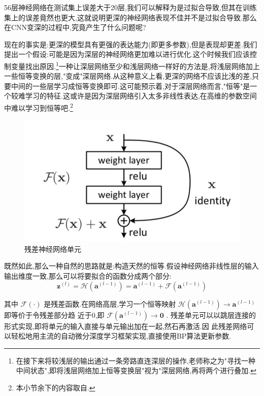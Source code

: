 56层神经网络在测试集上误差大于20层,我们可以解释为是过拟合导致,但其在训练集上的误差竟然也更大,这就说明更深的神经网络表现不佳并不是过拟合导致.那么在CNN变深的过程中,究竟产生了什么问题呢?

现在的事实是:更深的模型具有更强的表达能力(即更多参数),但是表现却更差.我们提出一个假设:可能是因为深层的神经网络更加难以进行优化.这个时候我们应该控制变量找出原因.\footnote{在接下来将较浅层的输出通过一条旁路直连深层的操作,老师称之为"寻找一种中间状态",即将浅层网络加上恒等变换层"视为"深层网络,再将两个进行叠加.}一种让深层网络至少和浅层网络一样好的方法是,将浅层网络加上一些恒等变换的层,"变成"深层网络.从这种意义上看,更深的网络不应该比浅的差,只要中间的一些层学习成恒等变换即可.这可能预示着,对于深层网络而言,"恒等"是一个较难学习的特征.这或许是因为深层网络引入太多非线性表达,在高维的参数空间中难以学习到恒等吧.\footnote{本小节余下的内容取自\cite{WhyResNetWorks}.}

\begin{figure}
	\includegraphics[scale=0.35]{figures/residual_network.png}
	\caption{残差神经网络单元}
\end{figure}

既然如此,那么一种自然的思路就是:构造天然的恒等.假设神经网络非线性层的输入输出维度一致,那么可以将要拟合的函数分成两个部分:
\begin{equation}
	\mathbf{z}^{(l)}=\mathcal{H}\left(\mathbf{a}^{(l-1)}\right)=\mathbf{a}^{(l-1)}+\mathcal{F}\left(\mathbf{a}^{(l-1)}\right)
	\label{残差神经网络表达式}
\end{equation}

其中 $\mathcal{F}(\cdot)$ 是残差函数.在网络高层,学习一个恒等映射 $\mathcal{H}\left(\mathbf{a}^{(l-1)}\right) \rightarrow \mathbf{a}^{(l-1)}$ 即等价于令残差部分趋 近于0,即 $\mathcal{F}\left(\mathbf{a}^{(l-1)}\right) \rightarrow \mathbf{0}$ .
残差单元可以以跳层连接的形式实现,即将单元的输入直接与单元输出加在一起,然石再激活.因 此残差网络可以轻松地用主流的自动微分深度学习框架实现,直接使用BP算法更新参数.

